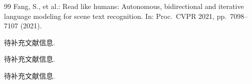 \documentclass[12pt, a4paper]{article}
\begin{document}
\begin{thebibliography}{99}
Fang, S., et al.:
Read like humans: Autonomous, bidirectional and iterative language modeling
for scene text recognition.
In: Proc.\ CVPR 2021, pp.\ 7098--7107 (2021).

待补充文献信息.

待补充文献信息.

待补充文献信息.

\end{thebibliography}
\end{document}
